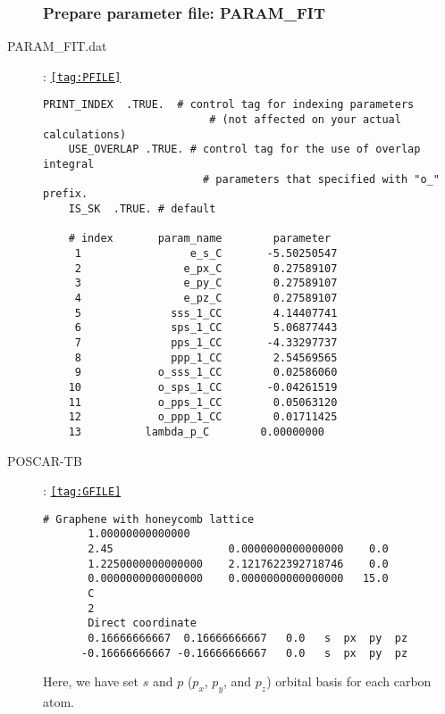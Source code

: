 \documentclass[a4paper,12pt]{scrartcl}
\makeatletter
\def\namedlabel#1#2{\begingroup
    #2%
    \def\@currentlabel{#2}%
    \phantomsection\label{#1}\endgroup
}
\makeatother
\begin{document}
\begin{description}
		\subsubsection{Prepare parameter file: PARAM\_FIT}
		
		\item[\namedlabel{tag:PARAM_FIT}{PARAM\_FIT.dat}] : {\texttt{\ref{tag:PFILE}}}
\begin{Verbatim}[commandchars=\\\{\},gobble=4, frame=single, framesep=2mm, 
    label= example of \ref{tag:PFILE} for Graphene,
    labelposition=bottomline]
    PRINT_INDEX  .TRUE.  # control tag for indexing parameters 
                          # (not affected on your actual calculations)
    USE_OVERLAP .TRUE. # control tag for the use of overlap integral
                         # parameters that specified with "o_" prefix.
    IS_SK  .TRUE. # default
    
    # index       param_name        parameter
     1                 e_s_C       -5.50250547
     2                e_px_C        0.27589107
     3                e_py_C        0.27589107
     4                e_pz_C        0.27589107
     5              sss_1_CC        4.14407741
     6              sps_1_CC        5.06877443
     7              pps_1_CC       -4.33297737
     8              ppp_1_CC        2.54569565
     9            o_sss_1_CC        0.02586060
    10            o_sps_1_CC       -0.04261519
    11            o_pps_1_CC        0.05063120
    12            o_ppp_1_CC        0.01711425
    13          lambda_p_C        0.00000000       
\end{Verbatim}
			
		\item[\namedlabel{tag:POSCAR}{POSCAR-TB}] : {\texttt{\ref{tag:GFILE}}}
\begin{Verbatim}[commandchars=\\\{\},gobble=4, frame=single, framesep=2mm, 
    label= example of \ref{tag:GFILE} for Graphene,
    labelposition=bottomline]
     # Graphene with honeycomb lattice
       1.00000000000000
       2.45                  0.0000000000000000    0.0
       1.2250000000000000    2.1217622392718746    0.0
       0.0000000000000000    0.0000000000000000   15.0
       C
       2
       Direct coordinate
       0.16666666667  0.16666666667   0.0   s  px  py  pz
      -0.16666666667 -0.16666666667   0.0   s  px  py  pz
\end{Verbatim}
 Here, we have set $s$ and $p$ ($p_x$, $p_y$, and $p_z$) orbital basis for each carbon atom.


\end{description}
\end{document}
